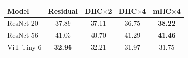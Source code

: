 \begin{tabular}{lcccc}
\toprule
Model & Residual & DHC$\times$2 & DHC$\times$4 & mHC$\times$4 \\
\midrule
ResNet-20 & 37.89 & 37.11 & 36.75 & \textbf{38.22} \\
ResNet-56 & 41.03 & 40.70 & 41.29 & \textbf{41.46} \\
ViT-Tiny-6 & \textbf{32.96} & 32.21 & 31.97 & 31.75 \\
\bottomrule
\end{tabular}
